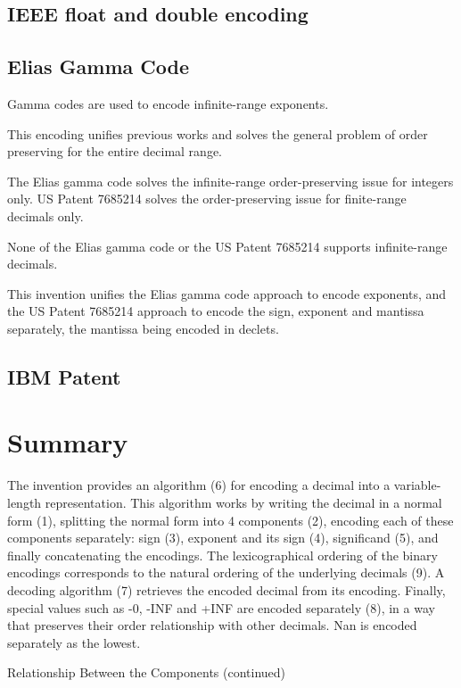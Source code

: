 \documentclass{acm_proc_article-sp}
\begin{document}
\subsection{IEEE float and double encoding}

\subsection{Elias Gamma Code}

 Gamma codes are used to encode infinite-range exponents.
 
This encoding unifies previous works and solves the general problem of order preserving for the entire decimal range.

The Elias gamma code solves the infinite-range order-preserving issue for integers only. US Patent 7685214 solves the order-preserving issue for finite-range decimals only.

None of the Elias gamma code or the US Patent 7685214 supports infinite-range decimals.

This invention unifies the Elias gamma code approach to encode exponents, and the US Patent 7685214 approach to encode the sign, exponent and mantissa separately, the mantissa being encoded in declets.

\subsection{IBM Patent}


\section{Summary}

The invention provides an algorithm (6) for encoding a decimal into a variable-length representation. This algorithm works by writing the decimal in a normal form (1), splitting the normal form into 4 components (2), encoding each of these components separately: sign (3), exponent and its sign (4), significand (5), and finally concatenating the encodings. The lexicographical ordering of the binary encodings corresponds to the natural ordering of the underlying decimals (9). A decoding algorithm (7) retrieves the encoded decimal from its encoding. Finally, special values such as -0, -INF and +INF are encoded separately (8), in a way that preserves their order relationship with other decimals. Nan is encoded separately as the lowest.

Relationship Between the Components (continued)
\end{document}
